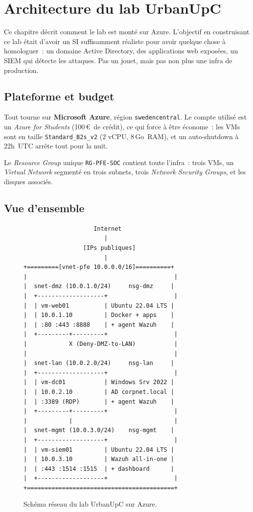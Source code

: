\chapter{Architecture du lab UrbanUpC}
\label{ch:lab-archi}

Ce chapitre décrit comment le lab est monté sur Azure. L'objectif
en construisant ce lab était d'avoir un SI suffisamment réaliste
pour avoir quelque chose à homologuer~: un domaine Active
Directory, des applications web exposées, un SIEM qui détecte les
attaques. Pas un jouet, mais pas non plus une infra de production.

\section{Plateforme et budget}

Tout tourne sur \textbf{Microsoft Azure}, région
\texttt{swedencentral}. Le compte utilisé est un \emph{Azure for
Students} (100\,\euro\ de crédit), ce qui force à être économe~:
les VMs sont en taille \texttt{Standard\_B2s\_v2} (2 vCPU,
8\,Go~RAM), et un auto-shutdown à 22h~UTC arrête tout pour la
nuit.

Le \emph{Resource Group} unique \texttt{RG-PFE-SOC} contient
toute l'infra~: trois VMs, un \emph{Virtual Network} segmenté en
trois subnets, trois \emph{Network Security Groups}, et les
disques associés.

\section{Vue d'ensemble}

\begin{figure}[h]
\centering
\begin{small}
\begin{verbatim}
                    Internet
                       |
                 [IPs publiques]
                       |
+=========[vnet-pfe 10.0.0.0/16]==========+
|                                          |
|  snet-dmz (10.0.1.0/24)     nsg-dmz     |
|  +-------------------+                   |
|  | vm-web01          | Ubuntu 22.04 LTS |
|  | 10.0.1.10         | Docker + apps    |
|  | :80 :443 :8888    | + agent Wazuh    |
|  +---------+---------+                   |
|            X (Deny-DMZ-to-LAN)           |
|                                          |
|  snet-lan (10.0.2.0/24)     nsg-lan     |
|  +-------------------+                   |
|  | vm-dc01           | Windows Srv 2022 |
|  | 10.0.2.10         | AD corpnet.local |
|  | :3389 (RDP)       | + agent Wazuh    |
|  +---------+---------+                   |
|            |                             |
|  snet-mgmt (10.0.3.0/24)    nsg-mgmt    |
|  +-------------------+                   |
|  | vm-siem01         | Ubuntu 22.04 LTS |
|  | 10.0.3.10         | Wazuh all-in-one |
|  | :443 :1514 :1515  | + dashboard      |
|  +-------------------+                   |
+==========================================+
\end{verbatim}
\end{small}
\caption{Schéma réseau du lab UrbanUpC sur Azure.}
\label{fig:archi-lab}
\end{figure}

